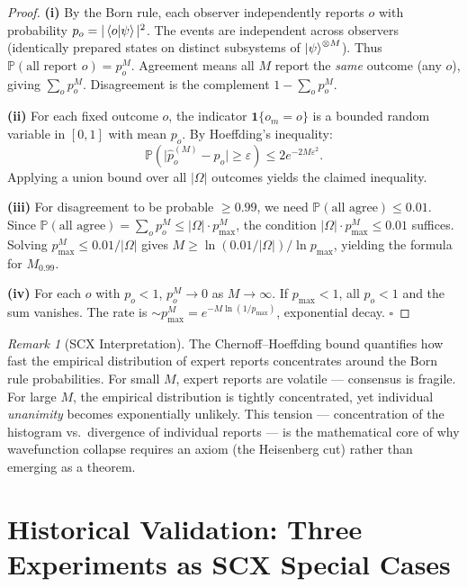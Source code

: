 \documentclass[11pt,a4paper]{article}
\theoremstyle{definition}
\theoremstyle{remark}
\newtheorem{remark}[theorem]{Remark}
\newcommand{\Pbb}{\mathbb{P}}
\begin{document}
\begin{proof}
\textbf{(i)} By the Born rule, each observer independently reports $o$ with probability $p_o = |\braket{o|\psi}|^2$. The events are independent across observers (identically prepared states on distinct subsystems of $\ket{\psi}^{\otimes M}$). Thus $\Pbb(\text{all report } o) = p_o^M$. Agreement means all $M$ report the \emph{same} outcome (any $o$), giving $\sum_o p_o^M$. Disagreement is the complement $1 - \sum_o p_o^M$.

\textbf{(ii)} For each fixed outcome $o$, the indicator $\mathbf{1}\{o_m = o\}$ is a bounded random variable in $[0, 1]$ with mean $p_o$. By Hoeffding's inequality:
\[
\Pbb\!\left(\bigl|\hat{p}_o^{(M)} - p_o\bigr| \geq \varepsilon\right) \leq 2e^{-2M\varepsilon^2}.
\]
Applying a union bound over all $|\Omega|$ outcomes yields the claimed inequality.

\textbf{(iii)} For disagreement to be probable $\geq 0.99$, we need $\Pbb(\text{all agree}) \leq 0.01$. Since $\Pbb(\text{all agree}) = \sum_o p_o^M \leq |\Omega| \cdot p_{\max}^M$, the condition $|\Omega| \cdot p_{\max}^M \leq 0.01$ suffices. Solving $p_{\max}^M \leq 0.01/|\Omega|$ gives $M \geq \ln(0.01/|\Omega|) / \ln p_{\max}$, yielding the formula for $M_{0.99}$.

\textbf{(iv)} For each $o$ with $p_o < 1$, $p_o^M \to 0$ as $M \to \infty$. If $p_{\max} < 1$, all $p_o < 1$ and the sum vanishes. The rate is $\sim p_{\max}^M = e^{-M \ln(1/p_{\max})}$, exponential decay. $\square$
\end{proof}

\begin{remark}[SCX Interpretation]
The Chernoff--Hoeffding bound quantifies how fast the empirical distribution of expert reports concentrates around the Born rule probabilities. For small $M$, expert reports are volatile --- consensus is fragile. For large $M$, the empirical distribution is tightly concentrated, yet individual \emph{unanimity} becomes exponentially unlikely. This tension --- concentration of the histogram vs.\ divergence of individual reports --- is the mathematical core of why wavefunction collapse requires an axiom (the Heisenberg cut) rather than emerging as a theorem.
\end{remark}

\section{Historical Validation: Three Experiments as SCX Special Cases}
\end{document}

